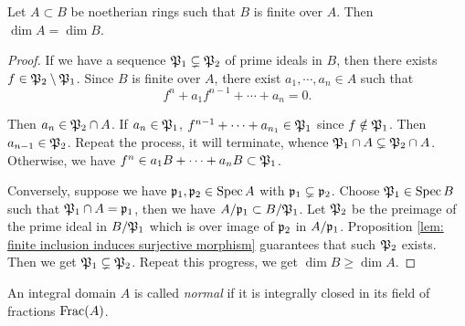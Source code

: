     \begin{proposition}\label{prop: finite morphisms preserve dimension}
        Let $A \subset B$ be noetherian rings such that $B$ is finite over $A$.
        Then $\dim A = \dim B$.
    \end{proposition}
    \begin{proof}
        If we have a sequence ${\mathfrak{P}}_1 \subsetneq {\mathfrak{P}}_2$ of prime ideals in $B$, then there exists $f \in {\mathfrak{P}}_2 \setminus {\mathfrak{P}}_1$.
        Since $B$ is finite over $A$, there exist $a_1,\cdots,a_n \in A$ such that 
        \[ f^n + a_1f^{n-1} + \cdots + a_n = 0.\]

        Then $a_n \in {\mathfrak{P}}_2 \cap A$.
        If $a_n \in {\mathfrak{P}}_1$, $f^{n-1} + \cdots + a_{n_1} \in {\mathfrak{P}}_1$ since $f \notin {\mathfrak{P}}_1$.
        Then $a_{n-1} \in {\mathfrak{P}}_2$.
        Repeat the process, it will terminate, whence ${\mathfrak{P}}_1 \cap A \subsetneq {\mathfrak{P}}_2 \cap A$.
        Otherwise, we have $f^n \in a_1 B+ \cdots + a_nB \subset {\mathfrak{P}}_1$.

        Conversely, suppose we have ${\mathfrak{p}}_1,{\mathfrak{p}}_2 \in \operatorname{Spec} A$ with ${\mathfrak{p}}_1 \subsetneq {\mathfrak{p}}_2$.
        Choose ${\mathfrak{P}}_1 \in \operatorname{Spec} B$ such that ${\mathfrak{P}}_1 \cap A = {\mathfrak{p}}_1$, then we have $A/{\mathfrak{p}}_1 \subset B/{\mathfrak{P}}_1$.
        Let ${\mathfrak{P}}_2$ be the preimage of the prime ideal in $B/{\mathfrak{P}}_1$ which is over image of ${\mathfrak{p}}_2$ in $A/{\mathfrak{p}}_1$.
        Proposition \ref{lem: finite inclusion induces surjective morphism} guarantees that such ${\mathfrak{P}}_2$ exists.
        Then we get ${\mathfrak{P}}_1 \subsetneq {\mathfrak{P}}_2$.
        Repeat this progress, we get $\dim B \geq \dim A$.
    \end{proof}




    \begin{definition}\label{def: normal domain}
        An integral domain $A$ is called \textit{normal} if it is integrally closed in its field of fractions $\operatorname{Frac}(A)$.
    \end{definition}

